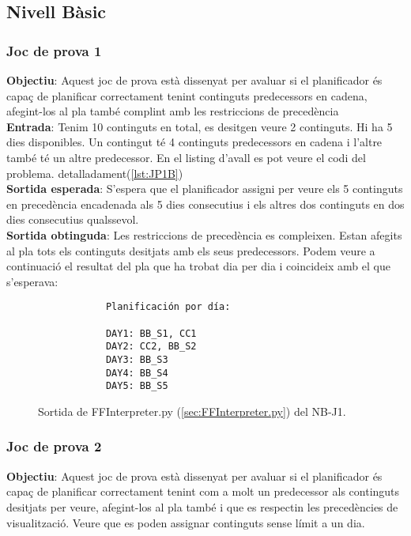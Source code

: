 \documentclass[a4paper]{article}
\begin{document}
	\subsection{Nivell Bàsic}
	
	\subsubsection*{Joc de prova 1}
	\noindent \textbf{Objectiu}: Aquest joc de prova està dissenyat per avaluar si el planificador és capaç de planificar correctament tenint continguts predecessors en cadena, afegint-los al pla també complint amb les restriccions de precedència \\
	
	\noindent \textbf{Entrada}: Tenim 10 continguts en total, es desitgen veure 2 continguts. Hi ha 5 dies disponibles. Un contingut té 4 continguts predecessors en cadena i l'altre també té un altre predecessor. En el listing d'avall es pot veure el codi del problema.  detalladament(\ref{lst:JP1B}) \\
	
	\noindent \textbf{Sortida esperada}: S'espera que el planificador assigni per veure els 5 continguts en precedència encadenada als 5 dies consecutius i els altres dos continguts en dos dies consecutius qualssevol. \\
	
	\noindent \textbf{Sortida obtinguda}: Les restriccions de  precedència es compleixen. Estan afegits al pla tots els continguts desitjats amb els seus predecessors. Podem veure a continuació el resultat del pla que ha trobat dia per dia i coincideix amb el que s'esperava:
	
	\begin{figure}[H]
		\centering
		\begin{verbatim}
			Planificación por día:
			
			DAY1: BB_S1, CC1
			DAY2: CC2, BB_S2
			DAY3: BB_S3
			DAY4: BB_S4
			DAY5: BB_S5		
		\end{verbatim}
		\caption{Sortida de FFInterpreter.py (\ref{sec:FFInterpreter.py}) del NB-J1.}
	\end{figure}
	
	
	\subsubsection*{Joc de prova 2}
	\noindent \textbf{Objectiu}: Aquest joc de prova està dissenyat per avaluar si el planificador és capaç de planificar correctament tenint com a molt un predecessor als continguts desitjats per veure, afegint-los al pla també i que es respectin les precedències de visualització. Veure que es poden assignar continguts sense límit a un dia. \\
	
\end{document}
